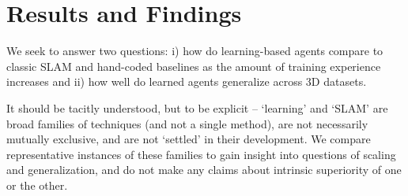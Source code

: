 \section{Results and Findings}




We seek to answer two questions: 
i) how do learning-based agents compare to classic SLAM 
and hand-coded baselines as the amount of training experience increases and 
ii) how well do learned agents generalize 
across 3D datasets. 

It should be tacitly understood, but to be explicit -- 
`learning' and `SLAM' are broad families of techniques 
(and not a single method), 
are not necessarily mutually exclusive, and are 
not `settled' in their development. We compare representative instances of these families to gain insight into questions of 
scaling and generalization, and do not make any claims 
about intrinsic superiority of one or the other. 


